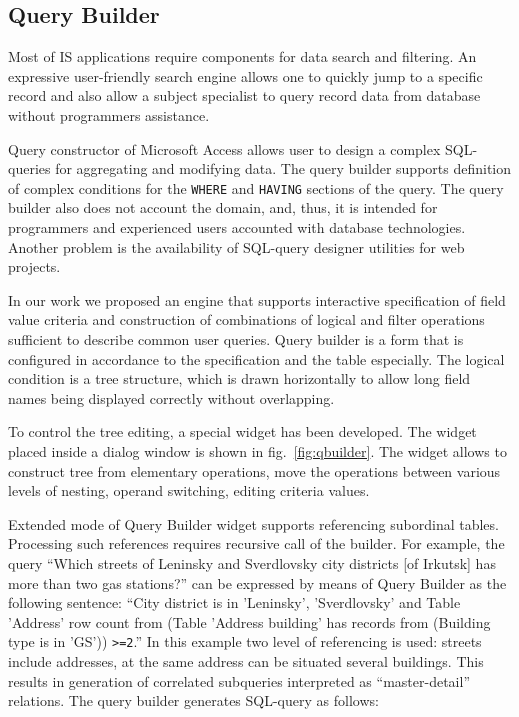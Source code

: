 \documentclass[conference]{IEEEtran}
\begin{document}
\subsection{Query Builder}
\label{sec:query-builder}

Most of IS applications require components for data search and filtering.  An expressive user-friendly search engine allows one to quickly jump to a specific record and also allow a subject specialist to query record data from database without programmers assistance.

Query constructor of Microsoft Access allows user to design a complex SQL-queries for aggregating and modifying data.  The query builder supports definition of complex conditions for the \texttt{WHERE} and \texttt{HAVING} sections of the query.  The query builder also does not account the domain, and, thus, it is intended for programmers and experienced users accounted with database technologies.  Another problem is the availability of SQL-query designer utilities for web projects.

In our work we proposed an engine that supports interactive specification of field value criteria and construction of combinations of logical and filter operations sufficient to describe common user queries.  Query builder is a form that is configured in accordance to the specification and the table especially.  The logical condition is a tree structure, which is drawn horizontally to allow long field names being displayed correctly without overlapping.

To control the tree editing, a special widget has been developed.  The widget placed inside a dialog window is shown in fig.~\ref{fig:qbuilder}.  The widget allows to construct tree from elementary operations, move the operations between various levels of nesting, operand switching, editing criteria values.

Extended mode of Query Builder widget supports referencing subordinal tables.  Processing such references requires recursive call of the builder.  For example, the query ``Which streets of Leninsky and Sverdlovsky city districts [of Irkutsk] has more than two gas stations?'' can be expressed by means of Query Builder as the following sentence: ``City district is in 'Leninsky', 'Sverdlovsky' and Table 'Address' row count from (Table 'Address building' has records from (Building type is in 'GS')) \verb|>=2|.''  In this example two level of referencing is used: streets include addresses, at the same address can be situated several buildings.  This results in generation of correlated subqueries interpreted as ``master-detail'' relations.  The query builder generates SQL-query as follows:
\end{document}
